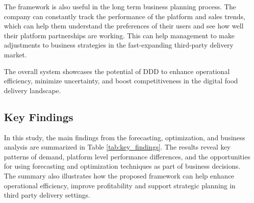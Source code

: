 The framework is also useful in the long term business planning process. The company can constantly track the performance of the platform and sales trends, which can help them understand the preferences of their users and see how well their platform partnerships are working. This can help management to make adjustments to business strategies in the fast-expanding third-party delivery market.

The overall system showcases the potential of DDD to enhance operational efficiency, minimize uncertainty, and boost competitiveness in the digital food delivery landscape.

\subsection{Key Findings}
In this study, the main findings from the forecasting, optimization, and business analysis are summarized in Table \ref{tab:key_findings}. The results reveal key patterns of demand, platform level performance differences, and the opportunities for using forecasting and optimization techniques as part of business decisions. The summary also illustrates how the proposed framework can help enhance operational efficiency, improve profitability and support strategic planning in third party delivery settings.
